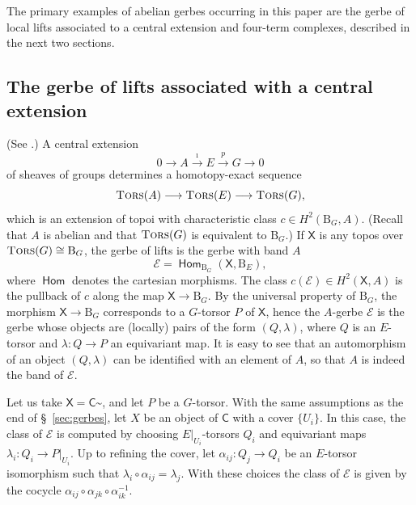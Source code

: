 \documentclass{amsart}
\numberwithin{equation}{subsection}
\theoremstyle{remark}
\theoremstyle{remark}
\newcommand{\too}{\longrightarrow}%
\newcommand{\cE}{\mathcal{E}}
\newcommand{\B}{\mathrm{B}} %
\newcommand{\C}{\mathsf{C}} %
\DeclareMathOperator{\HOM}{\mathsf{Hom}}
\newcommand{\iso}{\cong}
\newcommand{\shC}{\C\sptilde} %
\DeclareMathOperator{\tors}{\textsc{Tors}} %
\newcommand{\X}{\mathsf{X}} %
\begin{document}
The primary examples of abelian gerbes occurring in this paper are the gerbe of
local lifts associated to a central extension and four-term complexes, described
in the next two sections.

\subsection{The gerbe of lifts associated with a central extension}
\label{lifting}
(See \cite{Giraud,Breen94,Brylinskib}.)
A central extension
\begin{equation}
  \label{eq:7}
  0 \too A \overset{\imath}{\too} E\overset{p}{\too} G \too 0
\end{equation}
of sheaves of groups determines a homotopy-exact sequence
\begin{equation*}
  \tors(A) \too \tors(E)\too \tors(G),
\end{equation*}
which is an extension of topoi with characteristic class $c \in H^2(\B_G,A)$. (Recall that $A$ is abelian and that $\tors(G)$ is equivalent to $\B_G$.)
If $\X$ is any topos over $\tors(G)\iso \B_G$, the gerbe of lifts is the gerbe with band $A$
\begin{equation*}
  \cE = \HOM_{\B_G}(\X,\B_E),
\end{equation*}
where $\HOM$ denotes the cartesian morphisms. The class $c(\cE)\in H^2(\X,A)$ is the pullback of $c$ along the map $\X\to \B_G$. By the universal property of $\B_G$, the morphism $\X\to \B_G$ corresponds to a $G$-torsor $P$ of $\X$, hence the $A$-gerbe $\cE$ is the gerbe whose objects are (locally) pairs of the form $(Q,\lambda)$, where $Q$ is an $E$-torsor and $\lambda\colon Q\to P$ an equivariant map. It is easy to see that an automorphism of an object $(Q,\lambda)$ can be identified with an element of $A$, so that $A$ is indeed the band of $\cE$.

Let us take $\X=\shC$, and let $P$ be a $G$-torsor. With the same assumptions as the end of \S~\ref{sec:gerbes}, let $X$ be an object of $\C$ with a cover $\lbrace U_i\rbrace$. In this case, the class of $\cE$ is computed by choosing $E\rvert_{U_i}$-torsors $Q_i$ and equivariant maps $\lambda_i\colon Q_i\to P\rvert_{U_i}$. Up to refining the cover, let $\alpha_{ij}\colon Q_j\to Q_i$ be an $E$-torsor isomorphism such that $\lambda_i\circ \alpha_{ij}=\lambda_j$. With these choices the class of $\cE$ is given by the cocycle $\alpha_{ij}\circ \alpha_{jk} \circ \alpha_{ik}^{-1}$.
\end{document}
